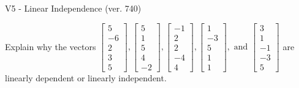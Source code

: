 \begin{exercise}
  \begin{exerciseTitle}V5 - Linear Independence (ver. 740)\end{exerciseTitle}
  \begin{exerciseStatement}
    Explain why the vectors \(\left[\begin{array}{r}
5 \\
-6 \\
2 \\
3 \\
5
\end{array}\right] , \left[\begin{array}{r}
5 \\
1 \\
5 \\
4 \\
-2
\end{array}\right] , \left[\begin{array}{r}
-1 \\
2 \\
2 \\
-4 \\
4
\end{array}\right] , \left[\begin{array}{r}
1 \\
-3 \\
5 \\
1 \\
1
\end{array}\right] , \text{ and } \left[\begin{array}{r}
3 \\
1 \\
-1 \\
-3 \\
5
\end{array}\right]\) are linearly dependent or linearly independent.	



\end{exerciseStatement}
\end{exercise}
